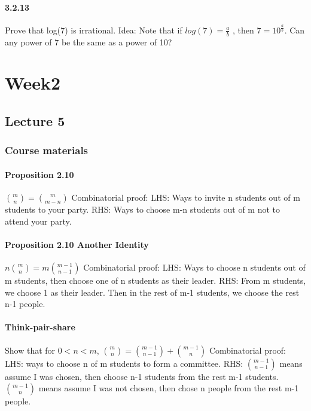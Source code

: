 \documentclass{article}
\begin{document}
\paragraph{3.2.13}
Prove that log(7) is irrational.\newline
Idea:\newline
Note that if $log(7)=\frac{a}{b}$
, then $7=10^\frac{a}{b}$. Can any power of 7 be the same as a power of 10?
\newpage \section{Week2}
\subsection{Lecture 5}
\subsubsection{Course materials}
\paragraph{Proposition 2.10}
$\binom{m}{n}=\binom{m}{m-n}$\newline
Combinatorial proof:\newline
LHS: Ways to invite n students out of m students to your party.\newline
RHS: Ways to choose m-n students out of m not to attend your party.
\paragraph{Proposition 2.10 Another Identity}
$n\binom{m}{n}=m\binom{m-1}{n-1}$\newline
Combinatorial proof:\newline
LHS: Ways to choose n students out of m students, then choose one of n students as their leader.\newline
RHS: From m students, we choose 1 as their leader. Then in the rest of m-1 students, we choose the rest n-1 people.
\paragraph{Think-pair-share}
Show that for $0<n<m$, $\binom{m}{n}=\binom{m-1}{n-1}+\binom{m-1}{n}$\newline
Combinatorial proof:\newline
LHS: ways to choose n of m students to form a committee.\newline
RHS: $\binom{m-1}{n-1}$ means assume I was chosen, then choose n-1 students from the rest m-1 students.$\binom{m-1}{n}$ means assume I was not chosen, then chose n people from the rest m-1 people.
\end{document}
